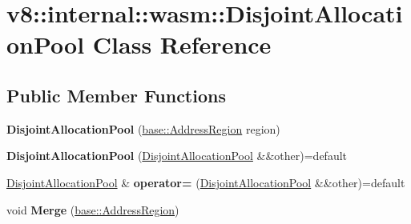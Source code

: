 \hypertarget{classv8_1_1internal_1_1wasm_1_1DisjointAllocationPool}{}\section{v8\+:\+:internal\+:\+:wasm\+:\+:Disjoint\+Allocation\+Pool Class Reference}
\label{classv8_1_1internal_1_1wasm_1_1DisjointAllocationPool}
\subsection*{Public Member Functions}
\begin{DoxyCompactItemize}
\item 
\mbox{\label{classv8_1_1internal_1_1wasm_1_1DisjointAllocationPool_abe288ab48fa44708c59d3313e745e9bf}} 
{\bfseries Disjoint\+Allocation\+Pool} (\mbox{\hyperlink{classv8_1_1base_1_1AddressRegion}{base\+::\+Address\+Region}} region)
\item 
\mbox{\label{classv8_1_1internal_1_1wasm_1_1DisjointAllocationPool_a12e160df78069c4d5adc057fa70e31ed}} 
{\bfseries Disjoint\+Allocation\+Pool} (\mbox{\hyperlink{classv8_1_1internal_1_1wasm_1_1DisjointAllocationPool}{Disjoint\+Allocation\+Pool}} \&\&other)=default
\item 
\mbox{\label{classv8_1_1internal_1_1wasm_1_1DisjointAllocationPool_ae2d0b9a7199b269c2b1ab3e1af5cd6de}} 
\mbox{\hyperlink{classv8_1_1internal_1_1wasm_1_1DisjointAllocationPool}{Disjoint\+Allocation\+Pool}} \& {\bfseries operator=} (\mbox{\hyperlink{classv8_1_1internal_1_1wasm_1_1DisjointAllocationPool}{Disjoint\+Allocation\+Pool}} \&\&other)=default
\item 
\mbox{\label{classv8_1_1internal_1_1wasm_1_1DisjointAllocationPool_a184940efebf687e625fa4b76398473c4}} 
void {\bfseries Merge} (\mbox{\hyperlink{classv8_1_1base_1_1AddressRegion}{base\+::\+Address\+Region}})
\item 
\mbox{\label{classv8_1_1internal_1_1wasm_1_1DisjointAllocationPool_a5a78c9832c8962fdc94b954e5b0adb65}} 

\end{DoxyCompactItemize}
